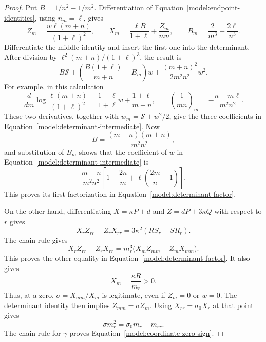\begin{proof}
Put \(B=1/n^2-1/m^2\).  Differentiation of
Equation~\eqref{model:endpoint-identities}, using \(n_m=\ell\), gives
\begin{equation}
 Z_m=\frac{w\ell(m+n)}{(1+\ell)^2},\qquad
 X_m=\frac{\ell B}{1+\ell}+\frac{Z_m}{mn},\qquad
 B_m=\frac2{m^3}-\frac{2\ell}{n^3}.
 \label{model:first-endpoint-derivatives}
\end{equation}
Differentiate the middle identity and insert the first one into the
determinant.  After division by \(\ell^2(m+n)/(1+\ell)^3\), the result is
\begin{equation}
 B\mathcal S+
 \left(\frac{B(1+\ell)}{m+n}-B_m\right)w
 +\frac{(m+n)^2}{2m^2n^2}w^2.
 \label{model:determinant-intermediate}
\end{equation}
For example, in this calculation
\[
 \frac{d}{dm}\log\frac{\ell(m+n)}{(1+\ell)^2}
 =\frac{1-\ell}{1+\ell}w+\frac{1+\ell}{m+n},
 \qquad
 \left(\frac1{mn}\right)_m=-\frac{n+m\ell}{m^2n^2}.
\]
These two derivatives, together with
\(w_m=\mathcal S+w^2/2\), give the three coefficients in
Equation~\eqref{model:determinant-intermediate}.
Now
\[
 B=\frac{(m-n)(m+n)}{m^2n^2},
\]
and substitution of \(B_m\) shows that the coefficient of \(w\) in
Equation~\eqref{model:determinant-intermediate} is
\[
 \frac{m+n}{m^2n^2}
 \left[1-\frac{2n}{m}
       +\ell\left(\frac{2m}{n}-1\right)\right].
\]
This proves its first factorization in
Equation~\eqref{model:determinant-factor}.

On the other hand, differentiating \(X=\kappa P+d\) and
\(Z=dP+3\kappa Q\) with respect to \(r\) gives
\[
 X_rZ_{rr}-Z_rX_{rr}=3\kappa^2(RS_r-SR_r).
\]
The chain rule gives
\[
 X_rZ_{rr}-Z_rX_{rr}
 =m_r^3\bigl(X_mZ_{mm}-Z_mX_{mm}\bigr).
\]
This proves the other equality in
Equation~\eqref{model:determinant-factor}.  It also gives
\begin{equation}
 X_m=\frac{\kappa R}{m_r}>0.
 \label{model:Xm-positive}
\end{equation}
Thus, at a zero, \(\sigma=X_{mm}/X_m\) is legitimate, even if
\(Z_m=0\) or \(w=0\).  The determinant identity then implies
\(Z_{mm}=\sigma Z_m\).
Using \(X_{rr}=\sigma_0X_r\) at that point gives
\[
 \sigma m_r^2=\sigma_0m_r-m_{rr}.
\]
The chain rule for \(\gamma\) proves
Equation~\eqref{model:coordinate-zero-sign}.


\end{proof}
